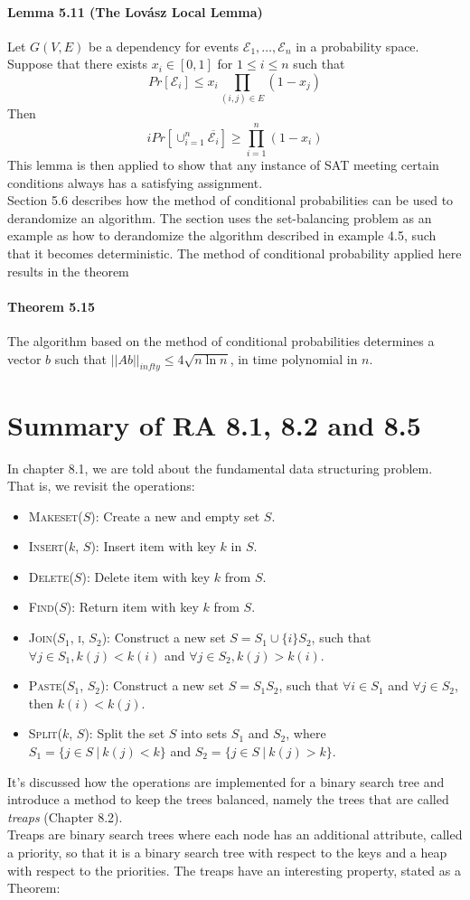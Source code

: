 \documentclass[a4paper, fleqn]{article}
\begin{document}
\paragraph{Lemma 5.11 (The Lovász Local Lemma)} Let $G(V,E)$ be a dependency for events $\mathcal{E}_1, \ldots,\mathcal{E}_n$ in a probability space. Suppose that there exists $x_i\in[0,1]$ for $1\leq i\leq n$ such that
$$
Pr[\mathcal{E}_i] \leq x_i \prod_{(i,j)\in E}(1-x_j)
$$
Then
$$i
Pr[\cup_{i=1}^n\overline{\mathcal{E}_i}]\geq \prod_{i=1}^{n}(1-x_i)
$$
This lemma is then applied to show that any instance of SAT meeting certain conditions always has a satisfying assignment.\\

Section 5.6 describes how the method of conditional probabilities can be used to derandomize an algorithm. The section uses the set-balancing problem as an example as how to derandomize the algorithm described in example 4.5, such that it becomes deterministic. The method of conditional probability applied here results in the theorem
\paragraph{Theorem 5.15} The algorithm based on the method of conditional probabilities determines a vector $b$ such that $|\!|Ab|\!|_{infty}\leq 4\sqrt{n\ln n}$, in time polynomial in $n$.

\section*{Summary of RA 8.1, 8.2 and 8.5}
In chapter 8.1, we are told about the fundamental data structuring problem. That is, we revisit the operations:
\begin{itemize}
  \item \textsc{Makeset($S$)}: Create a new and empty set $S$.
  \item \textsc{Insert($k$, $S$)}: Insert item with key $k$ in $S$.
  \item \textsc{Delete($S$)}: Delete item with key $k$ from $S$.
  \item \textsc{Find($S$)}: Return item with key $k$ from $S$.
  \item \textsc{Join($S_1$, i, $S_2$)}: Construct a new set $S=S_1 \cup \{i\} S_2$, such that $\forall j \in S_1, k(j) < k(i)$ and $\forall j \in S_2, k(j) > k(i)$.
  \item \textsc{Paste($S_1$, $S_2$)}: Construct a new set $S=S_1 S_2$, such that $\forall i \in S_1$ and $\forall j \in S_2$, then $k(i) < k(j)$.
  \item \textsc{Split($k$, $S$)}: Split the set $S$ into sets $S_1$ and $S_2$, where $S_1=\{j\in S\ |\ k(j) < k\}$ and $S_2=\{j\in S\ |\ k(j) > k\}$.  
\end{itemize}
It's discussed how the operations are implemented for a binary search tree and introduce a method to keep the trees balanced, namely the trees that are called \textit{treaps} (Chapter 8.2). \\
Treaps are binary search trees where each node has an additional attribute, called a priority, so that it is a binary search tree with respect to the keys and a heap with respect to the priorities. The treaps have an interesting property, stated as a Theorem:
\end{document}
